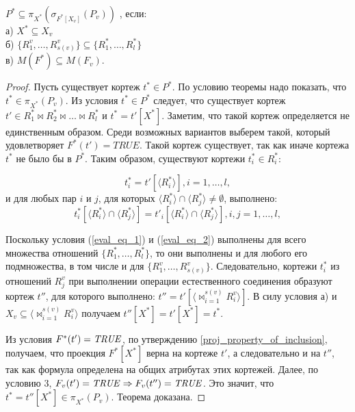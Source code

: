 \author{Мосин Сергей, Зыкин Сергей}
\begin{theorem}
$P^{\ast} \subseteq \pi_{X^{\ast}} (\sigma_{F^{\ast}[X_v]} (P_{v}))$
, если:
\\а) $X^{\ast} \subseteq X_{v}$
\\б) 
$ \{R^{v}_{1}, \ldots, R^{v}_{s(v)}\}
\subseteq
\{R^{\ast}_{1}, \ldots, R^{\ast}_{l}\} $
\\в) $M (F^{\ast}) \subseteq M (F_{v}) $.
\label{th_base}
\end{theorem} 
\begin{proof}
Пусть существует кортеж $t^{\ast} \in P^{\ast}$. По условию теоремы надо показать, 
что $t^{\ast} \in \pi_{X^{\ast}} (P_{v})$. Из условия $t^{\ast} \in P^{\ast}$ следует, 
что существует кортеж $t' \in R^{\ast}_1 \Join R^{\ast}_2\Join\ldots
\Join R^{\ast}_l$ и $t^{\ast} = t'[X^{\ast}]$. Заметим, что такой кортеж 
определяется не единственным образом. Среди возможных вариантов выберем такой, 
который удовлетворяет $F^{\ast}(t')=TRUE$. Такой кортеж существует, так как иначе
кортежа $t^{\ast}$ не было бы в $P^{\ast}$. Таким образом, существуют кортежи
$t^{\ast}_i \in R^{\ast}_i$:

\begin{equation}
t^{\ast}_i = t'[\langle R^{\ast}_i\rangle], i = 1,\dots,l,
\label{eval_eq_1}
\end{equation}
\def \intersecij {\langle R^{\ast}_i \rangle \cap \langle R^{\ast}_j \rangle}
и для любых пар $i$ и $j$, для которых $\intersecij \neq \emptyset$, выполнено:
\begin{equation}
t^{\ast}_i[\intersecij] = t'_i[\intersecij], i,j = 1,\dots,l,
\label{eval_eq_2}
\end{equation}

Поскольку условия (\ref{eval_eq_1}) и (\ref{eval_eq_2}) выполнены для всего множества
отношений $\{R^{\ast}_{1}, \ldots, R^{\ast}_{l}\}$, то они выполнены и для любого его
подмножества, в том числе и для $\{R^{v}_{1}, \ldots, R^{v}_{s(v)}\}$.
Следовательно, кортежи $t^{\ast}_i$ из отношений $R^{v}_j$ при выполнении операции
естественного соединения образуют кортеж $t''$, для которого выполнено:
$t'' = t'[\langle {\Join}_{i=1}^{s(v)} R^v_i \rangle]$. В силу условия а) и 
$X_v \subseteq \langle {\Join}_{i=1}^{s(v)} R^v_i \rangle$ получаем 
$t''[X^{\ast}] = t'[X^{\ast}] = t^{\ast}$.

Из условия  $F^{\ast}(t') = \mathit{TRUE}$, по утверждению
\ref{proj_property_of_inclusion}, получаем, что проекция $F^{\ast} [X^{\ast}]$
верна на кортеже $t'$, а следовательно и на $t''$, так как формула определена на
общих атрибутах этих кортежей. Далее, по условию 3, $F_v (t') = \mathit{TRUE} \Rightarrow F_v (t'') = \mathit{TRUE}$.
Это значит, что $t^{\ast} = t''[X^{\ast}] \in \pi_{X^{\ast}} (P_{v})$. Теорема
доказана.
\end{proof}
